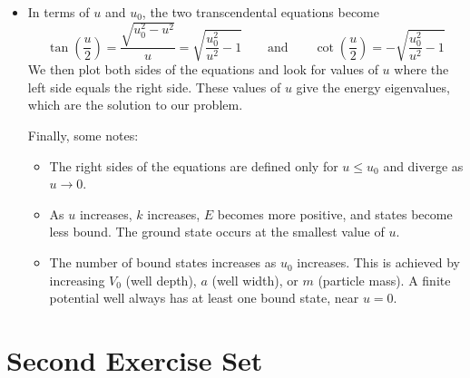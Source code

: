 \documentclass[11pt, a4paper]{article}
\newcommand{\eqtext}[1]{\qquad \text{#1} \qquad}
\begin{document}
\begin{itemize}
	\item In terms of $ u $ and $ u_{0} $, the two transcendental equations become
	\begin{equation*}
		\tan(\frac{u}{2}) = \frac{\sqrt{u_{0}^{2} - u^{2}}}{u} = \sqrt{\frac{u_{0}^{2}}{u^{2}} - 1} \eqtext{and} \cot(\frac{u}{2}) = -\sqrt{\frac{u_{0}^{2}}{u^{2}} - 1}
	\end{equation*}
	We then plot both sides of the equations and look for values of $ u $ where the left side equals the right side. These values of $ u $ give the energy eigenvalues, which are the solution to our problem.
	
	Finally, some notes:
	\begin{itemize}
		\item The right sides of the equations are defined only for $ u \leq u_{0} $ and diverge as $ u \to 0 $. 
		
		\item As $ u $ increases, $ k $ increases, $ E $ becomes more positive, and states become less bound. The ground state occurs at the smallest value of $ u $. 
		
		
		\item The number of bound states increases as $ u_{0} $ increases. This is achieved by increasing $ V_{0} $ (well depth), $ a $ (well width), or $ m $ (particle mass).  A finite potential well always has at least one bound state, near $ u = 0 $. 
	\end{itemize}
	
	

\end{itemize}



\section{Second Exercise Set}
\end{document}
